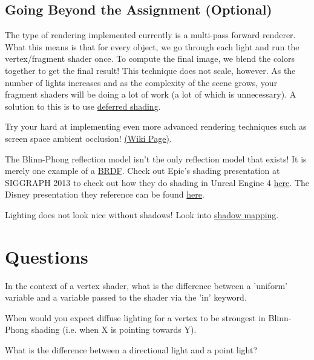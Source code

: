 \documentclass{article}
\begin{document}
\subsection*{Going Beyond the Assignment (Optional)}
\begin{itemize*}
    \item The type of rendering implemented currently is a multi-pass forward renderer. What this means is that for every object, we go through each light and run the vertex/fragment shader once. To compute the final image, we blend the colors together to get the final result! This technique does not scale, however. As the number of lights increases and as the complexity of the scene grows, your fragment shaders will be doing a lot of work (a lot of which is unnecessary). A solution to this is to use \href{https://en.wikipedia.org/wiki/Deferred_shading}{deferred shading}. 
    \item Try your hard at implementing even more advanced rendering techniques such as screen space ambient occlusion! \href{https://en.wikipedia.org/wiki/Screen_space_ambient_occlusion}{(Wiki Page)}.
    \item The Blinn-Phong reflection model isn't the only reflection model that exists! It is merely one example of a \href{https://en.wikipedia.org/wiki/Bidirectional_reflectance_distribution_function}{BRDF}. Check out Epic's shading presentation at SIGGRAPH 2013 to check out how they do shading in Unreal Engine 4 \href{http://blog.selfshadow.com/publications/s2013-shading-course/karis/s2013_pbs_epic_notes_v2.pdf}{here}. The Disney presentation they reference can be found \href{http://blog.selfshadow.com/publications/s2012-shading-course/burley/s2012_pbs_disney_brdf_notes_v3.pdf}{here}.
    \item Lighting does not look nice without shadows! Look into \href{https://en.wikipedia.org/wiki/Shadow_mapping}{shadow mapping}.
\end{itemize*}

\section*{Questions}
\begin{enumerate*}
    \item In the context of a vertex shader, what is the difference between a 'uniform' variable and a variable passed to the shader via the 'in' keyword.
    \item When would you expect diffuse lighting for a vertex to be strongest in Blinn-Phong shading (i.e. when X is pointing towards Y).
    \item What is the difference between a directional light and a point light?
\end{enumerate*}
\end{document}
